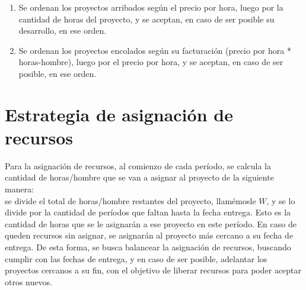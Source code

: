 \begin{enumerate}
    \item Se ordenan los proyectos arribados según el precio por hora, luego por la cantidad de horas del proyecto, y se aceptan, en caso de ser posible su desarrollo, en ese orden.\\

    \item Se ordenan los proyectos encolados según su facturación (precio por hora * horas-hombre), luego por el precio por hora, y se aceptan, en caso de ser posible, en ese orden.\\
\end{enumerate}



\section{Estrategia de asignación de recursos}

Para la asignación de recursos, al comienzo de cada período, se calcula la cantidad de horas/hombre que se van a asignar al proyecto de la siguiente manera: \\
se divide el total de horas/hombre restantes del proyecto, llamémosle $W$, y se lo divide por la 
cantidad de períodos que faltan hasta la fecha entrega. Esto es la cantidad de horas que se le asignarán a ese proyecto en este período.
En caso de queden recursos sin asignar, se asignarán al proyecto más cercano a su fecha de entrega. 
De esta forma, se busca balancear la asignación de recursos, buscando cumplir con las fechas de entrega, y en caso de ser posible, adelantar los proyectos 
cercanos a su fin, con el objetivo de liberar recursos para poder aceptar otros nuevos.

